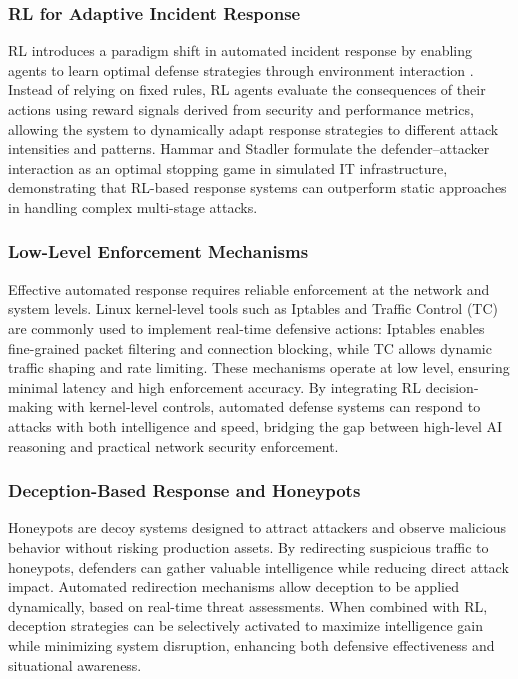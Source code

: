 \documentclass[conference]{IEEEtran}
\begin{document}
\subsubsection{RL for Adaptive Incident Response}
RL introduces a paradigm shift in automated incident response by enabling
agents to learn optimal defense strategies through environment interaction
\cite{malialis2015ddos,nguyen2021drl}. Instead of relying on fixed rules,
RL agents evaluate the consequences of their actions using reward signals
derived from security and performance metrics, allowing the system to
dynamically adapt response strategies to different attack intensities and
patterns. Hammar and Stadler \cite{hammar2024tnsm} formulate the
defender--attacker interaction as an optimal stopping game in simulated IT
infrastructure, demonstrating that RL-based response systems can outperform
static approaches in handling complex multi-stage attacks.

\subsubsection{Low-Level Enforcement Mechanisms}
Effective automated response requires reliable enforcement at the network and
system levels. Linux kernel-level tools such as Iptables and Traffic Control
(TC) are commonly used to implement real-time defensive actions: Iptables
enables fine-grained packet filtering and connection blocking, while TC
allows dynamic traffic shaping and rate limiting. These mechanisms operate
at low level, ensuring minimal latency and high enforcement accuracy. By
integrating RL decision-making with kernel-level controls, automated defense
systems can respond to attacks with both intelligence and speed, bridging
the gap between high-level AI reasoning and practical network security
enforcement.

\subsubsection{Deception-Based Response and Honeypots}
Honeypots are decoy systems designed to attract attackers and observe
malicious behavior without risking production assets. By redirecting
suspicious traffic to honeypots, defenders can gather valuable intelligence
while reducing direct attack impact. Automated redirection mechanisms allow
deception to be applied dynamically, based on real-time threat assessments.
When combined with RL, deception strategies can be selectively activated
to maximize intelligence gain while minimizing system disruption, enhancing
both defensive effectiveness and situational awareness.
\end{document}
